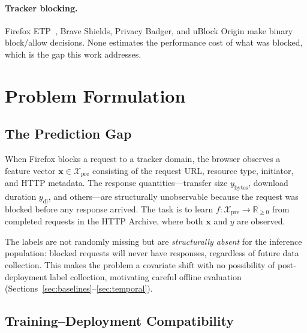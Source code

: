 \documentclass[sigconf,nonacm]{acmart}
\begin{document}
\paragraph{Tracker blocking.}
Firefox ETP~\cite{disconnectlist}, Brave Shields, Privacy Badger, and uBlock Origin make binary block/allow decisions.
None estimates the performance cost of what was blocked, which is the gap this work addresses.

\section{Problem Formulation}
\label{sec:problem}

\subsection{The Prediction Gap}

When Firefox blocks a request to a tracker domain, the browser observes a feature vector $\mathbf{x} \in \mathcal{X}_\text{pre}$ consisting of the request URL, resource type, initiator, and HTTP metadata.
The response quantities---transfer size $y_\text{bytes}$, download duration $y_\text{dl}$, and others---are structurally unobservable because the request was blocked before any response arrived.
The task is to learn $f: \mathcal{X}_\text{pre} \to \mathbb{R}_{\geq 0}$ from completed requests in the HTTP Archive, where both $\mathbf{x}$ and $y$ are observed.

The labels are not randomly missing but are \emph{structurally absent} for the inference population: blocked requests will never have responses, regardless of future data collection.
This makes the problem a covariate shift with no possibility of post-deployment label collection, motivating careful offline evaluation (Sections~\ref{sec:baselines}--\ref{sec:temporal}).

\subsection{Training--Deployment Compatibility}
\end{document}
